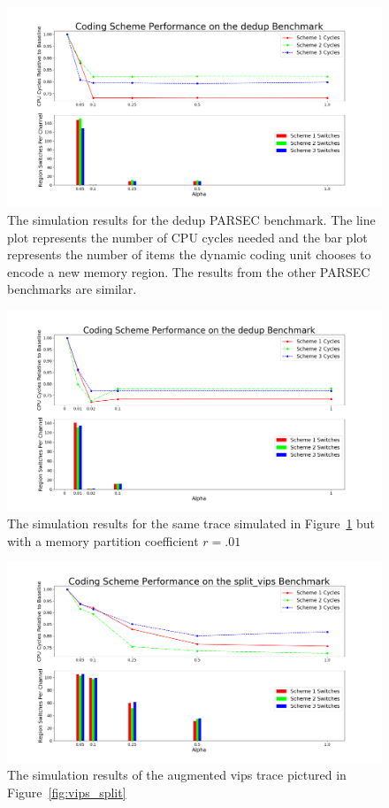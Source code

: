 \begin{figure}[htbp]
		\includegraphics[width=\linewidth]{fig/dedup_benchmark_results.png}
		\caption{The simulation results for the dedup PARSEC benchmark. The line plot represents the number of CPU cycles needed and the bar plot represents the number of items the dynamic coding unit chooses to encode a new memory region. The results from the other PARSEC benchmarks are similar.}
		\label{fig:dedup_results}
\end{figure}

\begin{figure}[htbp]
		\includegraphics[width=\linewidth]{fig/dedup_hundreth.png}
		\caption{The simulation results for the same trace simulated in Figure~\ref{fig:dedup_results} but with a memory partition coefficient $r = .01$}
		\label{fig:dedup_hundreth}
\end{figure}

\begin{figure}[htbp]
		\includegraphics[width=\linewidth]{fig/vips_split_results.png}
		\caption{The simulation results of the augmented vips trace pictured in Figure~\ref{fig:vips_split}}
		\label{fig:vips_split_result}
\end{figure}

